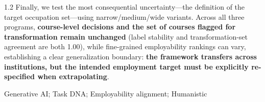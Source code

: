 \begin{spacing}{1.2}
Finally, we test the most consequential uncertainty---the definition of the target occupation set---using narrow/medium/wide variants. Across all three programs, \textbf{course-level decisions and the set of courses flagged for transformation remain unchanged} (label stability and transformation-set agreement are both 1.00), while fine-grained employability rankings can vary, establishing a clear generalization boundary: \textbf{the framework transfers across institutions, but the intended employment target must be explicitly re-specified when extrapolating}.

\end{spacing}

\begin{keywords}
Generative AI; Task DNA; Employability alignment; Humanistic 
\end{keywords}
